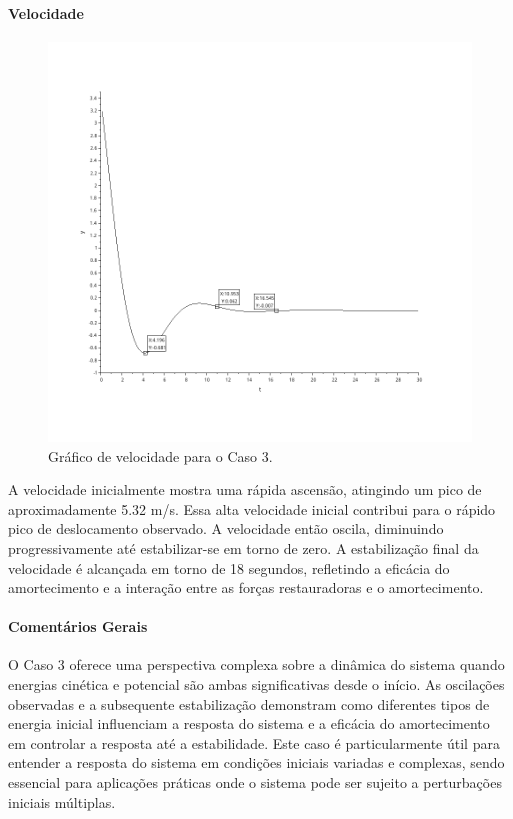 \paragraph{Velocidade}
\begin{figure}[H]
    \centering
    \includegraphics[height=0.7\textwidth]{final/2-atividade/assets/velocidade-caso-3.png}
    \caption{Gráfico de velocidade para o Caso 3.}
\end{figure}
A velocidade inicialmente mostra uma rápida ascensão, atingindo um pico de aproximadamente 5.32 m/s. Essa alta velocidade inicial contribui para o rápido pico de deslocamento observado. A velocidade então oscila, diminuindo progressivamente até estabilizar-se em torno de zero. A estabilização final da velocidade é alcançada em torno de 18 segundos, refletindo a eficácia do amortecimento e a interação entre as forças restauradoras e o amortecimento.

\paragraph{Comentários Gerais}
O Caso 3 oferece uma perspectiva complexa sobre a dinâmica do sistema quando energias cinética e potencial são ambas significativas desde o início. As oscilações observadas e a subsequente estabilização demonstram como diferentes tipos de energia inicial influenciam a resposta do sistema e a eficácia do amortecimento em controlar a resposta até a estabilidade. Este caso é particularmente útil para entender a resposta do sistema em condições iniciais variadas e complexas, sendo essencial para aplicações práticas onde o sistema pode ser sujeito a perturbações iniciais múltiplas.

